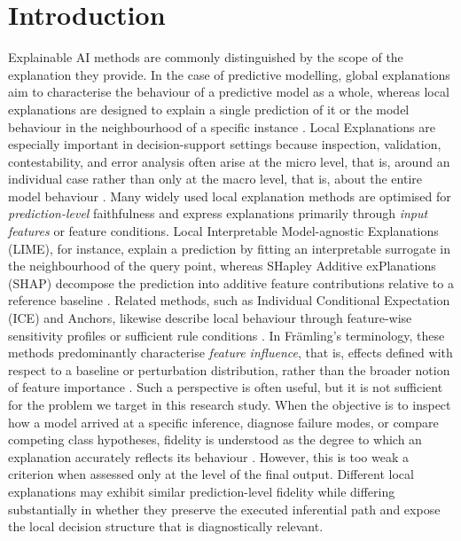 \documentclass[runningheads]{llncs}
\begin{document}
\section{Introduction}
Explainable AI methods are commonly distinguished by the scope of the explanation they provide. In the case of predictive modelling, global explanations aim to characterise the behaviour of a predictive model as a whole, whereas local explanations are designed to explain a single prediction of it or the model behaviour in the neighbourhood of a specific instance \cite{vilone2021notions}. 
Local
Explanations are especially important in decision-support settings because inspection, validation, contestability, and error analysis often arise at the micro level, that is, around an individual case rather than only at the macro level, that is, about the entire model behaviour \cite{nauta2023anecdotal}.
Many widely used local explanation methods are optimised for \emph{prediction-level} faithfulness and express explanations primarily through \emph{input features} or feature conditions. 
Local Interpretable Model-agnostic Explanations (LIME), for instance, explain a prediction by fitting an interpretable surrogate in the neighbourhood of the query point, whereas SHapley Additive exPlanations (SHAP) decompose the prediction into additive feature contributions relative to a reference baseline \cite{ribeiro2016why,lundberg2017unified}. 
Related methods, such as Individual Conditional Expectation (ICE) and Anchors, likewise describe local behaviour through feature-wise sensitivity profiles or sufficient rule conditions
\cite{goldstein2015ice,ribeiro2018anchors}.
In Fr\"amling's terminology, these methods predominantly characterise \emph{feature influence}, that is, effects defined with respect to a baseline or perturbation distribution, rather than the broader notion of feature importance \cite{framling2023importanceinfluence}.
Such a perspective is often useful, but it is not sufficient for the problem we target in this research study. 
When the objective is to inspect how a model arrived at a specific inference, diagnose failure modes, or compare competing class hypotheses, fidelity is understood as the degree to which an explanation accurately reflects its behaviour \cite{vilone2021notions}.
However, this is too weak a criterion when assessed only at the level of the final output. 
Different local explanations may exhibit similar prediction-level fidelity while differing substantially in whether they preserve the executed inferential path and expose the local decision structure that is diagnostically relevant.
\end{document}

